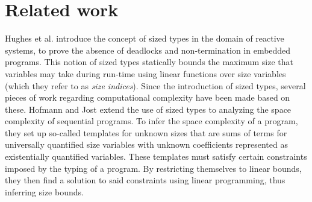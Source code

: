 
\section{Related work}\label{sec:relatedwork}
Hughes et al. \cite{HughesEtAl1996} introduce the concept of sized types in the domain of reactive systems, to prove the absence of deadlocks and non-termination in embedded programs. This notion of sized types statically bounds the maximum size that variables may take during run-time using linear functions over size variables (which they refer to as \textit{size indices}). Since the introduction of sized types, several pieces of work regarding computational complexity have been made based on these. Hofmann and Jost \cite{HofmannAndJost2003} extend the use of sized types to analyzing the space complexity of sequential programs. To infer the space complexity of a program, they set up so-called templates for unknown sizes that are sums of terms for universally quantified size variables with unknown coefficients represented as existentially quantified variables. These templates must satisfy certain constraints imposed by the typing of a program. By restricting themselves to linear bounds, they then find a solution to said constraints using linear programming, thus inferring size bounds.\\

